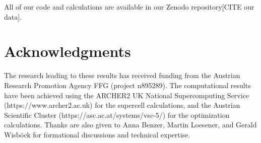 \documentclass[aps,prmaterials,reprint,amsmath,amssymb,superscriptaddress]{revtex4-2}
\begin{document}
All of our code and calculations are available in our Zenodo repository[CITE our data].

\section*{Acknowledgments}

The research leading to these results has received funding from the Austrian Research Promotion Agency FFG (project n895289). The computational results have been achieved using the ARCHER2 UK National Supercomputing Service (https://www.archer2.ac.uk) for the supercell calculations, and the Austrian Scientific Cluster (https://asc.ac.at/systems/vsc-5/) for the optimization calculations. Thanks are also given to Anna Benzer, Martin Loesener, and Gerald Wisb{\"o}ck for formational discussions and technical expertise.

\nocite{}


\end{document}
